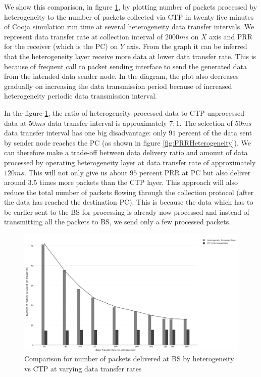     \par
    We show this comparison, in figure \ref{fig:DataProcessingHetvsCTP}, by plotting number of packets processed by heterogeneity to the number of packets collected via \ac{CTP} in twenty five minutes of Cooja simulation run time at several heterogeneity data transfer intervals. We represent data transfer rate at collection interval of $2000ms$ on $X$ axis and \ac{PRR} for the receiver (which is the \ac{PC}) on $Y$ axis. From the graph it can be inferred that the heterogeneity layer receive more data at lower data transfer rate. This is because of frequent call to packet sending interface to send the generated data from the intended data sender node. In the diagram, the plot also decreases gradually on increasing the data transmission period because of increased heterogeneity periodic data transmission interval. 
    
    \par
    In the figure \ref{fig:DataProcessingHetvsCTP}, the ratio of heterogeneity processed data to \ac{CTP} unprocessed data at $50ms$ data transfer interval is approximately $7:1$. The selection of $50ms$ data transfer interval has one big disadvantage: only $91$ percent of the data sent by sender node reaches the \ac{PC} (as shown in figure \ref{fig:PRRHeterogeneity}). We can therefore make a trade-off between data delivery ratio and amount of data processed by operating heterogeneity layer at data transfer rate of approximately $120ms$. This will not only give us about $95$ percent \ac{PRR} at \ac{PC} but also deliver around $3.5$ times more packets than the \ac{CTP} layer. This approach will also reduce the total number of packets flowing through the collection protocol (after the data has reached the destination \ac{PC}). This is because the data which has to be earlier sent to the \ac{BS} for processing is already now processed and instead of transmitting all the packets to \ac{BS}, we send only a few processed packets. 
    
    \begin{figure}
    \centering
    \includegraphics[width=1.0\textwidth]{gfx/RPlots/DataProcessingHetvsCTP.png}
    \caption{Comparison for number of packets delivered at \ac{BS} by heterogeneity vs CTP at varying data transfer rates}
    \label{fig:DataProcessingHetvsCTP}
    \end{figure}



